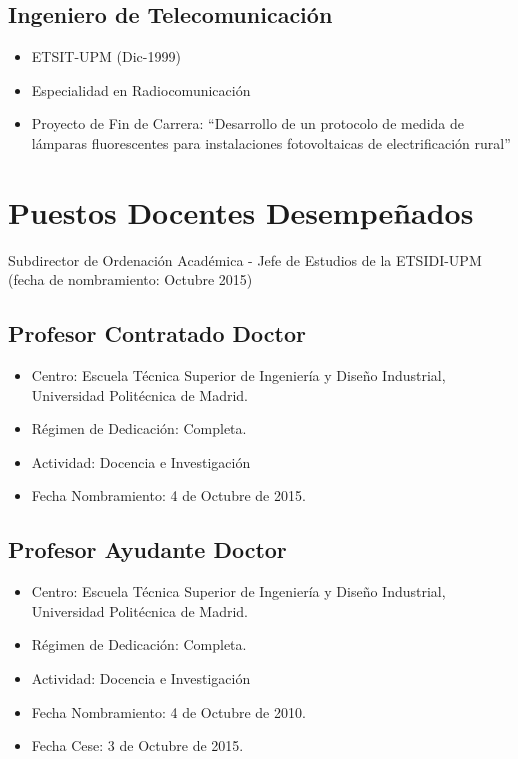 \documentclass[article, a4paper]{memoir}
\begin{document}
\subsection{Ingeniero de Telecomunicación}
\label{sec:orgd5c894c}
\begin{itemize}
\item ETSIT-UPM (Dic-1999)
\item Especialidad en Radiocomunicación
\item Proyecto de Fin de Carrera: ``Desarrollo de un protocolo de medida de lámparas fluorescentes para instalaciones fotovoltaicas de electrificación rural''
\end{itemize}

\newpage
\section{Puestos Docentes Desempeñados}
\label{sec:org0c339fe}

Subdirector de Ordenación Académica - Jefe de Estudios de la ETSIDI-UPM (fecha de nombramiento: Octubre 2015)

\subsection{Profesor Contratado Doctor}
\label{sec:orgf4d2736}
\begin{itemize}
\item Centro: Escuela Técnica Superior de Ingeniería y Diseño Industrial, Universidad Politécnica de Madrid.
\item Régimen de Dedicación: Completa.
\item Actividad: Docencia e Investigación
\item Fecha Nombramiento: 4 de Octubre de 2015.
\end{itemize}

\subsection{Profesor Ayudante Doctor}
\label{sec:org888aa07}
\begin{itemize}
\item Centro: Escuela Técnica Superior de Ingeniería y Diseño Industrial, Universidad Politécnica de Madrid.
\item Régimen de Dedicación: Completa.
\item Actividad: Docencia e Investigación
\item Fecha Nombramiento: 4 de Octubre de 2010.
\item Fecha Cese: 3 de Octubre de 2015.
\end{itemize}
\end{document}
